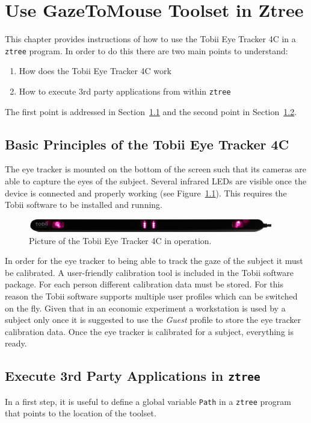 \documentclass[a4paper,oneside]{book}
\begin{document}
\chapter{Use GazeToMouse Toolset in Ztree}
\label{sec.gazetomouse}
This chapter provides instructions of how to use the Tobii Eye Tracker 4C in a \texttt{ztree} program.
In order to do this there are two main points to understand:
\begin{enumerate}
    \item How does the Tobii Eye Tracker 4C work
    \item How to execute 3rd party applications from within \texttt{ztree}
\end{enumerate}
The first point is addressed in Section~\ref{sec.eyetracker} and the second point in Section~\ref{sec.external}.

\section{Basic Principles of the Tobii Eye Tracker 4C}
\label{sec.eyetracker}
The eye tracker is mounted on the bottom of the screen such that its cameras are able to capture the eyes of the subject.
Several infrared LEDs are visible once the device is connected and properly working (see Figure~\ref{fig.eyetracker}).
This requires the Tobii software to be installed and running.
\begin{figure}[ht]
    \centering
    \includegraphics[width=0.95\textwidth]{eye_tracker.jpg}
    \caption{Picture of the Tobii Eye Tracker 4C in operation.}
    \label{fig.eyetracker}
\end{figure}

In order for the eye tracker to being able to track the gaze of the subject it must be calibrated.
A user-friendly calibration tool is included in the Tobii software package.
For each person different calibration data must be stored.
For this reason the Tobii software supports multiple user profiles which can be switched on the fly.
Given that in an economic experiment a workstation is used by a subject only once it is suggested to use the \emph{Guest} profile to store the eye tracker calibration data.
Once the eye tracker is calibrated for a subject, everything is ready.

\section{Execute 3rd Party Applications in \texttt{ztree}}
\label{sec.external}
In a first step, it is useful to define a global variable \texttt{Path} in a \texttt{ztree} program that points to the location of the toolset.
\end{document}
